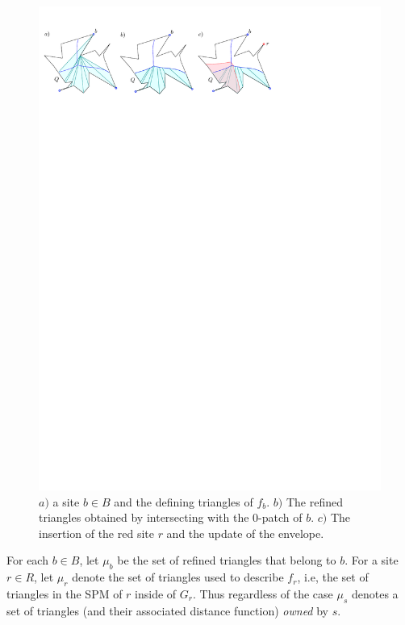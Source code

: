 \documentclass[a4paper,UKenglish]{socg-lipics-v2018}
\newcommand{\icell}[1][i]{${#1}$-patch\xspace}
\begin{document}
\begin{figure}[ht]
\centering
\includegraphics{RefinedDiagram.pdf}
\caption{$a)$ a site $b\in B$ and the defining triangles of $f_b$. 
$b)$ The refined triangles obtained by intersecting with the \icell[0] of $b$.
$c)$ The insertion of the red site $r$ and the update of the envelope. }
\label{fig:RrefinedDiagram}
\end{figure}



For each $b\in B$, let $\mu_b$ be the set of refined triangles that belong to $b$. 
For a site $r\in R$, let $\mu_r$ denote the set of triangles used to describe $f_r$, i.e,  the set of triangles in the SPM of $r$ inside of $G_r$.
Thus regardless of the case $\mu_s$ denotes a set of triangles (and their associated distance function) \emph{owned} by $s$.
\end{document}
